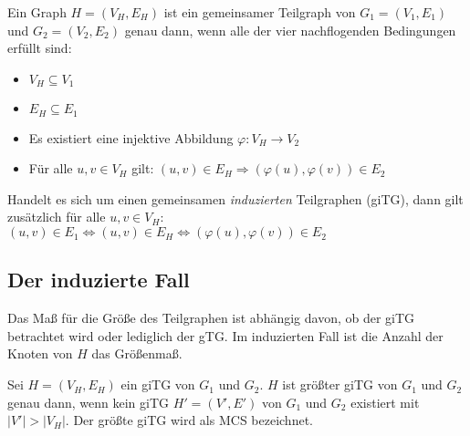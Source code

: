 \begin{mydef}\label{def:gTG} 
Ein Graph $H=(V_H,E_H)$ ist ein gemeinsamer Teilgraph von $G_1 = (V_1,E_1)$ und 
$G_2=(V_2,E_2)$ genau dann, wenn alle der vier nachflogenden Bedingungen 
erfüllt sind:
\begin{itemize}
  \item $V_H \subseteq V_1$
  \item $E_H \subseteq E_1$
	\item Es existiert eine injektive Abbildung $\varphi: V_H \rightarrow V_2$
	\item Für alle $u,v \in V_H$ gilt: $(u,v) \in E_H \Rightarrow (\varphi(u),
	      \varphi(v)) \in E_2$
\end{itemize}

Handelt es sich um einen gemeinsamen \emph{induzierten} Teilgraphen (giTG), 
dann gilt zusätzlich für alle $u,v \in V_H$: $(u,v) \in E_1 \Leftrightarrow 
(u,v) \in E_H \Leftrightarrow (\varphi(u),\varphi(v)) \in E_2$
\end{mydef}

\subsection{Der induzierte Fall}
Das Maß für die Größe des Teilgraphen ist abhängig davon, ob 
der giTG betrachtet wird oder lediglich der gTG. Im induzierten 
Fall ist die Anzahl der Knoten von $H$ das Größenmaß.

\begin{mydef}
Sei $H=(V_H,E_H)$ ein giTG von $G_1$ und $G_2$. $H$ ist größter giTG von 
$G_1$ und $G_2$ genau dann, wenn kein giTG $H'=(V',E')$ von $G_1$ und $G_2$ 
existiert mit $|V'|>|V_H|$. Der größte giTG wird als MCS bezeichnet.
\end{mydef}


